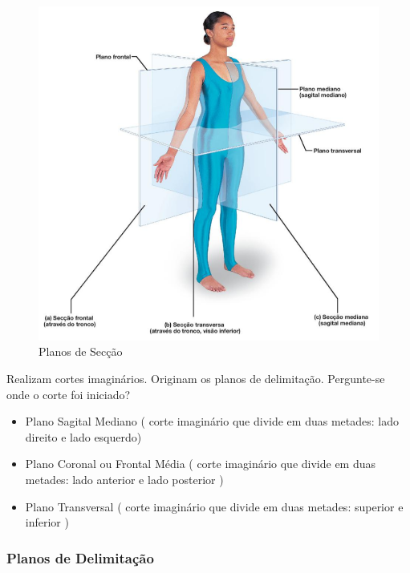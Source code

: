 \documentclass[
]{book}
\providecommand{\tightlist}{%
  \setlength{\itemsep}{0pt}\setlength{\parskip}{0pt}}
\begin{document}
\begin{figure}

{\centering \includegraphics[width=0.9\linewidth]{figuras/Aula2-2 - Planos de Seccao} 

}

\caption{Planos de Secção}\label{fig:unnamed-chunk-3}
\end{figure}

Realizam cortes imaginários. Originam os planos de delimitação. Pergunte-se onde o corte foi iniciado?

\begin{itemize}
\tightlist
\item
  Plano Sagital Mediano ( corte imaginário que divide em duas metades: lado direito e lado esquerdo)
\item
  Plano Coronal ou Frontal Média ( corte imaginário que divide em duas metades: lado anterior e lado posterior )
\item
  Plano Transversal ( corte imaginário que divide em duas metades: superior e inferior )
\end{itemize}

\hypertarget{planos-de-delimitauxe7uxe3o}{%
\subsubsection*{Planos de Delimitação}\label{planos-de-delimitauxe7uxe3o}}
\end{document}
